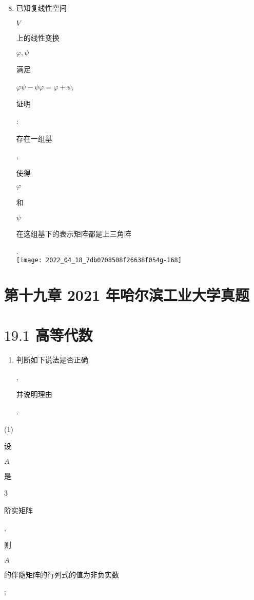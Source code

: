 \documentclass[10pt]{article}
\begin{document}
\begin{enumerate}
  \setcounter{enumi}{7}
  \item \begin{CJK}{UTF8}{mj}已知复线性空间\end{CJK} $V$ \begin{CJK}{UTF8}{mj}上的线性变换\end{CJK} $\varphi, \psi$ \begin{CJK}{UTF8}{mj}满足\end{CJK} $\varphi \psi-\psi \varphi=\varphi+\psi$, \begin{CJK}{UTF8}{mj}证明\end{CJK}: \begin{CJK}{UTF8}{mj}存在一组基\end{CJK}, \begin{CJK}{UTF8}{mj}使得\end{CJK} $\varphi$ \begin{CJK}{UTF8}{mj}和\end{CJK} $\psi$ \begin{CJK}{UTF8}{mj}在这组基下的表示矩阵都是上三角阵\end{CJK}.\\

\texttt{[image: 2022\_04\_18\_7db0708508f26638f054g-168]}
\end{enumerate}
\section{第十九章 2021 年哈尔滨工业大学真题}
\section{$19.1$ 高等代数}
\begin{enumerate}
  \item \begin{CJK}{UTF8}{mj}判断如下说法是否正确\end{CJK}, \begin{CJK}{UTF8}{mj}并说明理由\end{CJK}.
\end{enumerate}
(1) \begin{CJK}{UTF8}{mj}设\end{CJK} $A$ \begin{CJK}{UTF8}{mj}是\end{CJK} 3 \begin{CJK}{UTF8}{mj}阶实矩阵\end{CJK}, \begin{CJK}{UTF8}{mj}则\end{CJK} $A$ \begin{CJK}{UTF8}{mj}的伴隨矩阵的行列式的值为非负实数\end{CJK};
\end{document}

